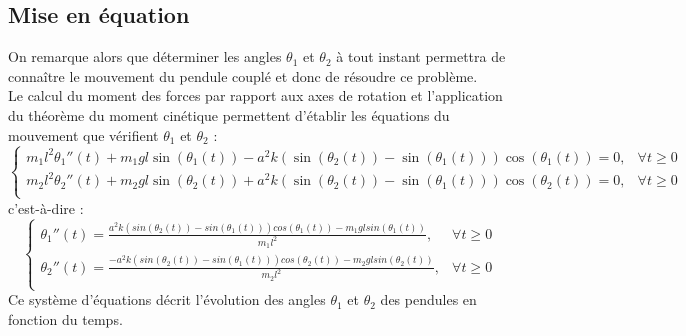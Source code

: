 \documentclass[9pt,a4paper]{article}
\begin{document}
\subsection{Mise en équation}
On remarque alors que déterminer les angles $\theta_1$ et $\theta_2$ à tout instant permettra de connaître le mouvement du pendule couplé et donc de résoudre ce problème.\\
Le calcul du moment des forces par rapport aux axes de rotation et l'application du théorème du moment cinétique permettent d'établir les équations du mouvement que vérifient $\theta_1$ et $\theta_2$ :
$$
\left\{
\begin{array}{lcl}
    m_1l^2\theta_1''(t) + m_1gl\sin(\theta_1(t)) - a^2k(\sin(\theta_2(t)) - \sin(\theta_1(t)))\cos(\theta_1(t)) = 0, & \forall t \geq 0 \\
    m_2l^2\theta_2''(t) + m_2gl\sin(\theta_2(t)) + a^2k(\sin(\theta_2(t)) - \sin(\theta_1(t)))\cos(\theta_2(t)) = 0, & \forall t \geq 0 \\
\end{array}
\right.
$$
c'est-à-dire :
$$
\left\{
\begin{array}{lcl}
    \theta_1''(t) = \frac{a^2k(sin(\theta_2(t))-sin(\theta_1(t)))cos(\theta_1(t))-m_1glsin(\theta_1(t))}{m_1l^2}, & \forall t \geq 0 \\
    \theta_2''(t) = \frac{-a^2k(sin(\theta_2(t))-sin(\theta_1(t)))cos(\theta_2(t))-m_2glsin(\theta_2(t))}{m_2l^2}, & \forall t \geq 0 \\
\end{array}
\right.
$$
Ce système d'équations décrit l'évolution des angles $\theta_1$ et $\theta_2$ des pendules en fonction du temps.
\end{document}

